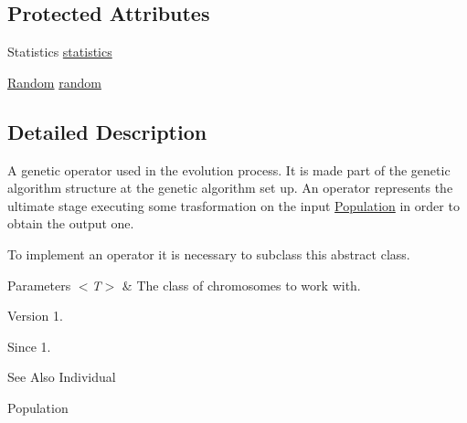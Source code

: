 \subsection*{Protected Attributes}
\begin{DoxyCompactItemize}
\item 
Statistics \hyperlink{classjenes_1_1stage_1_1operator_1_1_operator_3_01_t_01extends_01_chromosome_01_4_a45afa214a1e9109845c8f67165942675}{statistics}
\item 
\hyperlink{classjenes_1_1utils_1_1_random}{Random} \hyperlink{classjenes_1_1stage_1_1operator_1_1_operator_3_01_t_01extends_01_chromosome_01_4_af8cbd8837ce95101e238bdcc3dce5573}{random}
\end{DoxyCompactItemize}


\subsection{Detailed Description}
A genetic operator used in the evolution process. It is made part of the genetic algorithm structure at the genetic algorithm set up. An operator represents the ultimate stage executing some trasformation on the input \hyperlink{}{Population} in order to obtain the output one. 

To implement an operator it is necessary to subclass this abstract class.


\begin{DoxyParams}{Parameters}
{\em $<$\-T$>$} & The class of chromosomes to work with.\\
\hline
\end{DoxyParams}
\begin{DoxyVersion}{Version}
1. 
\end{DoxyVersion}
\begin{DoxySince}{Since}
1.
\end{DoxySince}
\begin{DoxySeeAlso}{See Also}
Individual 

Population 
\end{DoxySeeAlso}


